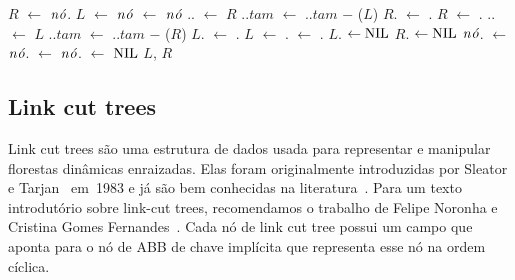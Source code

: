 \begin{algorithm}
\caption{\treapSplitRight($\node$)}
\label{Algo:TREAPsplitRight}
\begin{algorithmic}[1]
\State $R$ $\gets $ $\node$.
\State $L$ $\gets $ $\node$ \label{Algo:TREAPsplitRight:linha:atribuicao}
\State {} $\gets$ $\node$
    \State {}.. $\gets$ $R$
    \State {}..$tam$ $\gets$ ..$tam$ $\mathit{-}$ \treapGetSize($L$)
    \State $R$. $\gets$ .
    \EndIf
    \State $R$ $\gets$ .
  \Else
    \State {}.. $\gets$ $L$ 
    \State {}..$tam$ $\gets$ ..$tam$ $\mathit{-}$ \treapGetSize($R$)
    \State $L$. $\gets$ .
    \EndIf
    \State $L$ $\gets$ .
  \EndIf
  \State {} $\gets$ .
\EndWhile
{} $L$. $\gets\text{NIL}$\EndIf
{} $R$. $\gets\text{NIL}$\EndIf
\State $\node$. $\gets $ $\node$. $\gets$ $\node$. $\gets$ $\text{NIL}$
\State\Return $L$, $R$
\end{algorithmic}
\end{algorithm}

\subsection{Link cut trees}
\label{sec:linkcuttree}
Link cut trees são uma estrutura de dados usada para representar e manipular florestas dinâmicas enraizadas.
Elas foram originalmente introduzidas por Sleator e Tarjan~\cite{SleatroTarjanLinkCutTree1983,} em~1983 e já são bem conhecidas na literatura~\cite{linkcuttree,EncyclopediaAlgorithms,tarjanWerneck2010}.
Para um texto introdutório sobre link-cut trees, recomendamos o trabalho de Felipe Noronha e Cristina Gomes Fernandes~\cite{linkcuttree}.
Cada nó de link cut tree possui um campo  que aponta para o nó de ABB de chave implícita que representa esse nó na ordem cíclica.

